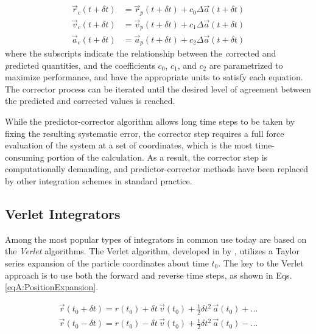 \begin{align}
   \vec{r}_c(t + \delta t) & = \vec{r}_p(t + \delta t) + c_0 \Delta \vec{a}(t +
         \delta t) \nonumber \\
   \vec{v}_c(t + \delta t) & = \vec{v}_p(t + \delta t) + c_1 \Delta \vec{a}(t +
         \delta t)
   \label{eqA:Corrector} \\
   \vec{a}_c(t + \delta t) & = \vec{a}_p(t + \delta t) + c_2 \Delta \vec{a}(t +
         \delta t) \nonumber
\end{align}
where the subscripts indicate the relationship between the \emph{c}orrected and
\emph{p}redicted quantities, and the coefficients $c_0$, $c_1$, and $c_2$ are
parametrized to maximize performance, \cite{Gear1966, Gear1971} and have the
appropriate units to satisfy each equation. \cite{Allen_Tildesley} The corrector
process can be iterated until the desired level of agreement between the
predicted and corrected values is reached.

While the predictor-corrector algorithm allows long time steps to be taken by
fixing the resulting systematic error, the corrector step requires a full force
evaluation of the system at a set of coordinates, which is the most
time-consuming portion of the calculation. As a result, the corrector step is
computationally demanding, and predictor-corrector methods have been replaced by
other integration schemes in standard practice.

\subsection{Verlet Integrators}

Among the most popular types of integrators in common use today are based on the
\emph{Verlet} algorithms. The Verlet algorithm, developed in
\citeyear{Verlet_PhysRev_1967_v159_p98} by
\citeauthor{Verlet_PhysRev_1967_v159_p98}, utilizes a Taylor series expansion of
the particle coordinates about time $t_0$. The key to the Verlet approach is to
use both the forward and reverse time steps, as shown in Eqs.
\ref{eqA:PositionExpansion}. \cite{Allen_Tildesley}

\begin{align}
   \vec{r}(t_0 + \delta t) = r(t_0) + \delta t \, \vec{v}(t_0) + \frac 1 2
         \delta t^2 \, \vec{a}(t_0) + ... \nonumber \\
   \vec{r}(t_0 - \delta t) = r(t_0) - \delta t \, \vec{v}(t_0) + \frac 1 2
         \delta t^2 \, \vec{a}(t_0) - ...
   \label{eqA:PositionExpansion}
\end{align}

